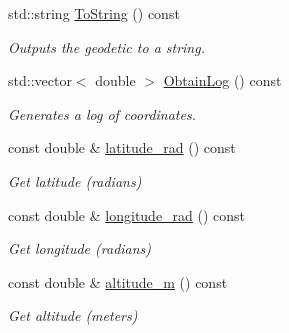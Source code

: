 \begin{DoxyCompactItemize}
std\+::string \hyperlink{classosse_1_1collaborate_1_1_geodetic_ac2fee1f9452db5b6543962cc5ff54cc0}{To\+String} () const
\begin{DoxyCompactList}\small\item\em Outputs the geodetic to a string. \end{DoxyCompactList}\item 
std\+::vector$<$ double $>$ \hyperlink{classosse_1_1collaborate_1_1_geodetic_a4fac054aeeb63048ae1621888c952af6}{Obtain\+Log} () const
\begin{DoxyCompactList}\small\item\em Generates a log of coordinates. \end{DoxyCompactList}\item 
const double \& \hyperlink{classosse_1_1collaborate_1_1_geodetic_a3947d5953fc888fd1b822e8e0a9688e9}{latitude\+\_\+rad} () const
\begin{DoxyCompactList}\small\item\em Get latitude (radians) \end{DoxyCompactList}\item 
const double \& \hyperlink{classosse_1_1collaborate_1_1_geodetic_a300f08b52f55d9d7f339d94548ac4745}{longitude\+\_\+rad} () const
\begin{DoxyCompactList}\small\item\em Get longitude (radians) \end{DoxyCompactList}\item 
const double \& \hyperlink{classosse_1_1collaborate_1_1_geodetic_a4c166387a76e142c6bb500b0e34dc782}{altitude\+\_\+m} () const
\begin{DoxyCompactList}\small\item\em Get altitude (meters) \end{DoxyCompactList}\end{DoxyCompactItemize}
